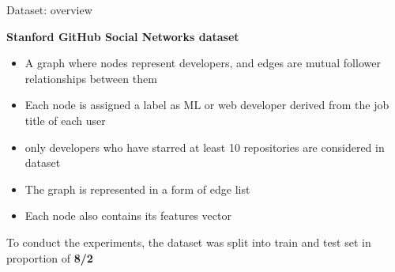 \begin{frame}{Dataset: overview}
\begin{center}
\begin{block}{\textbf{Stanford GitHub Social Networks dataset \cite{rozemberczki2019multiscale}}}
    \begin{itemize}
        \item A graph where nodes represent developers, and edges are mutual follower relationships between them
        \item Each node is assigned a label as ML or web developer derived from the job title of each user
        \item only developers who have starred at least 10 repositories are considered in dataset
        \item The graph is represented in a form of edge list
        \item Each node also contains its features vector
    \end{itemize}
To conduct the experiments, the dataset was split into train and test set in proportion of \textbf{8/2}
\end{block}
\end{center}
\end{frame}

